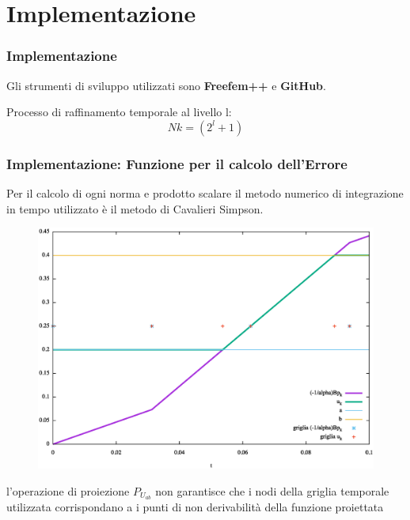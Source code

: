 \documentclass{beamer}
\theoremstyle{definition}
\theoremstyle{remark}
\theoremstyle{plain}
\theoremstyle{definition}
\begin{document}
\section{Implementazione}
\begin{frame}
\frametitle{Implementazione}
Gli strumenti di sviluppo utilizzati sono \textbf{Freefem++} e \textbf{GitHub}.

Processo di raffinamento temporale al livello l: 
\begin{equation}
Nk = ( 2^l + 1 )
\label{Nk}
\end{equation}


\end{frame}
\frametitle{Implementazione: Funzione per il calcolo dell'Errore}
\begin{frame}

Per il calcolo di ogni norma e prodotto scalare il metodo numerico di integrazione in tempo utilizzato è il metodo di Cavalieri Simpson.

\begin{figure}
\centering
\includegraphics[scale=0.25]{img/cap5/griglie}
\label{fig:griglie}
\end{figure}

l'operazione di proiezione $P_{U_{ab}}$ non garantisce che i nodi della griglia temporale utilizzata corrispondano a i punti di non derivabilità della funzione proiettata

\end{frame}
\end{document}
